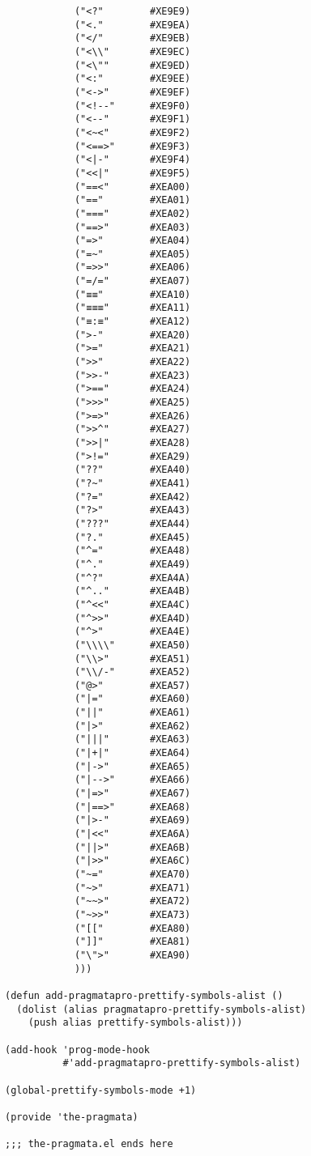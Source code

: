 \documentclass[11pt]{article}
\begin{document}
\begin{verbatim}
            ("<?"        #XE9E9)
            ("<."        #XE9EA)
            ("</"        #XE9EB)
            ("<\\"       #XE9EC)
            ("<\""       #XE9ED)
            ("<:"        #XE9EE)
            ("<->"       #XE9EF)
            ("<!--"      #XE9F0)
            ("<--"       #XE9F1)
            ("<~<"       #XE9F2)
            ("<==>"      #XE9F3)
            ("<|-"       #XE9F4)
            ("<<|"       #XE9F5)
            ("==<"       #XEA00)
            ("=="        #XEA01)
            ("==="       #XEA02)
            ("==>"       #XEA03)
            ("=>"        #XEA04)
            ("=~"        #XEA05)
            ("=>>"       #XEA06)
            ("=/="       #XEA07)
            ("≡≡"        #XEA10)
            ("≡≡≡"       #XEA11)
            ("≡:≡"       #XEA12)
            (">-"        #XEA20)
            (">="        #XEA21)
            (">>"        #XEA22)
            (">>-"       #XEA23)
            (">=="       #XEA24)
            (">>>"       #XEA25)
            (">=>"       #XEA26)
            (">>^"       #XEA27)
            (">>|"       #XEA28)
            (">!="       #XEA29)
            ("??"        #XEA40)
            ("?~"        #XEA41)
            ("?="        #XEA42)
            ("?>"        #XEA43)
            ("???"       #XEA44)
            ("?."        #XEA45)
            ("^="        #XEA48)
            ("^."        #XEA49)
            ("^?"        #XEA4A)
            ("^.."       #XEA4B)
            ("^<<"       #XEA4C)
            ("^>>"       #XEA4D)
            ("^>"        #XEA4E)
            ("\\\\"      #XEA50)
            ("\\>"       #XEA51)
            ("\\/-"      #XEA52)
            ("@>"        #XEA57)
            ("|="        #XEA60)
            ("||"        #XEA61)
            ("|>"        #XEA62)
            ("|||"       #XEA63)
            ("|+|"       #XEA64)
            ("|->"       #XEA65)
            ("|-->"      #XEA66)
            ("|=>"       #XEA67)
            ("|==>"      #XEA68)
            ("|>-"       #XEA69)
            ("|<<"       #XEA6A)
            ("||>"       #XEA6B)
            ("|>>"       #XEA6C)
            ("~="        #XEA70)
            ("~>"        #XEA71)
            ("~~>"       #XEA72)
            ("~>>"       #XEA73)
            ("[["        #XEA80)
            ("]]"        #XEA81)
            ("\">"       #XEA90)
            )))

(defun add-pragmatapro-prettify-symbols-alist ()
  (dolist (alias pragmatapro-prettify-symbols-alist)
    (push alias prettify-symbols-alist)))

(add-hook 'prog-mode-hook
          #'add-pragmatapro-prettify-symbols-alist)

(global-prettify-symbols-mode +1)

(provide 'the-pragmata)

;;; the-pragmata.el ends here
\end{verbatim}
\end{document}

